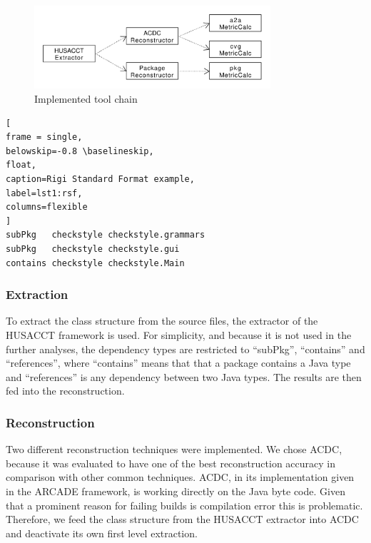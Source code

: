 \documentclass[conference]{IEEEtran}
\begin{document}
\begin{figure}[!t]
	\centering
	\includegraphics[width=3.45in]{assets/implementedArc.pdf}
	\caption{Implemented tool chain}
	\label{implToolchain}
\end{figure}

\begin{lstlisting}[
frame = single, 
belowskip=-0.8 \baselineskip,
float,
caption=Rigi Standard Format example,
label=lst1:rsf,
columns=flexible
]
subPkg   checkstyle checkstyle.grammars
subPkg   checkstyle checkstyle.gui
contains checkstyle checkstyle.Main
\end{lstlisting}



\subsubsection{Extraction}

To extract the class structure from the source files, the extractor of the HUSACCT framework is used. For simplicity, and because it is not used in the further analyses, the dependency types are restricted to ``subPkg'', ``contains'' and ``references'', where ``contains'' means that that a package contains a Java type and ``references'' is any dependency between two Java types. The results are then fed into the reconstruction.

\subsubsection{Reconstruction}

Two different reconstruction techniques were implemented. We chose ACDC, because it was evaluated to have one of the best reconstruction accuracy \cite{arcRec-comparison} in comparison with other common techniques. ACDC, in its implementation given in the ARCADE framework, is working directly on the Java byte code. Given that a prominent reason for failing builds is compilation error this is problematic. Therefore, we feed the class structure from the HUSACCT extractor into ACDC and deactivate its own first level extraction.
\end{document}
